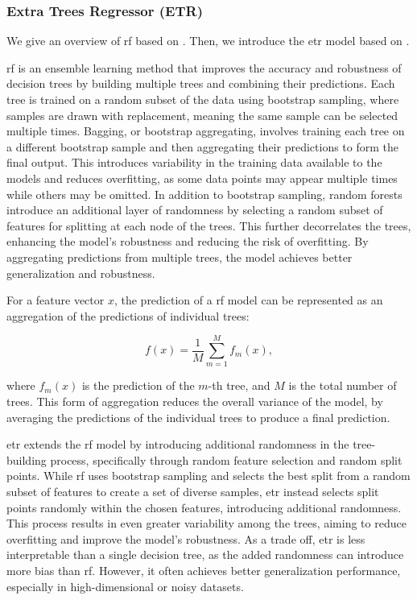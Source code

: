 \subsubsection{Extra Trees Regressor (ETR)}
We give an overview of \gls{rf} based on \citet{James2023AnIS}.
Then, we introduce the \gls{etr} model based on \citet{geurtsERF}.

\gls{rf} is an ensemble learning method that improves the accuracy and robustness of decision trees by building multiple trees and combining their predictions.
Each tree is trained on a random subset of the data using bootstrap sampling, where samples are drawn with replacement, meaning the same sample can be selected multiple times.
Bagging, or bootstrap aggregating, involves training each tree on a different bootstrap sample and then aggregating their predictions to form the final output.
This introduces variability in the training data available to the models and reduces overfitting, as some data points may appear multiple times while others may be omitted.
In addition to bootstrap sampling, random forests introduce an additional layer of randomness by selecting a random subset of features for splitting at each node of the trees.
This further decorrelates the trees, enhancing the model's robustness and reducing the risk of overfitting.
By aggregating predictions from multiple trees, the model achieves better generalization and robustness.

For a feature vector $x$, the prediction of a \gls{rf} model can be represented as an aggregation of the predictions of individual trees:

$$
f(x) = \frac{1}{M} \sum_{m=1}^{M} f_m(x),
$$

where $f_m(x)$ is the prediction of the $m$-th tree, and $M$ is the total number of trees.
This form of aggregation reduces the overall variance of the model, by averaging the predictions of the individual trees to produce a final prediction.

\gls{etr} extends the \gls{rf} model by introducing additional randomness in the tree-building process, specifically through random feature selection and random split points.
While \gls{rf} uses bootstrap sampling and selects the best split from a random subset of features to create a set of diverse samples, \gls{etr} instead selects split points randomly within the chosen features, introducing additional randomness.
This process results in even greater variability among the trees, aiming to reduce overfitting and improve the model's robustness.
As a trade off, \gls{etr} is less interpretable than a single decision tree, as the added randomness can introduce more bias than \gls{rf}.
However, it often achieves better generalization performance, especially in high-dimensional or noisy datasets.
